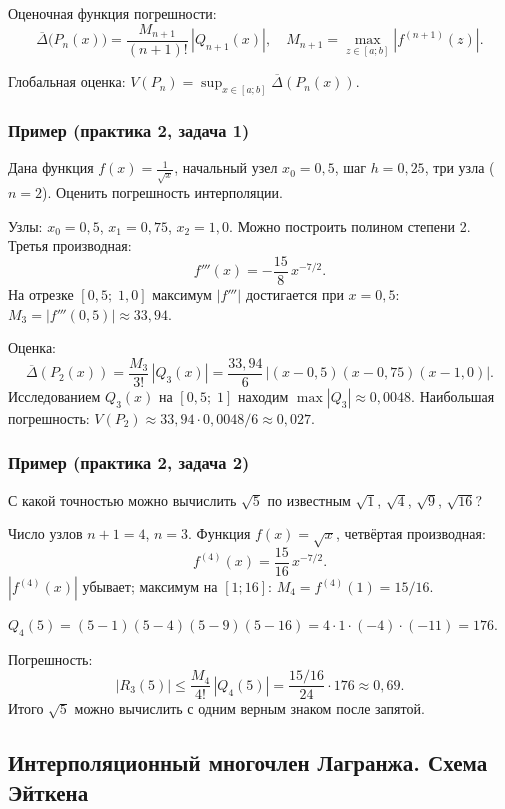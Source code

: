 Оценочная функция погрешности:
\[
    \overline{\Delta}\bigl(P_n(x)\bigr) = \frac{M_{n+1}}{(n+1)!}\, |Q_{n+1}(x)|, \quad M_{n+1} = \max_{z \in [a;b]} |f^{(n+1)}(z)|.
\]

Глобальная оценка: $V(P_n) = \sup_{x \in [a;b]} \overline{\Delta}(P_n(x))$.

\subsubsection*{Пример (практика 2, задача 1)}

Дана функция $f(x) = \frac{1}{\sqrt{x}}$, начальный узел $x_0 = 0{,}5$, шаг $h = 0{,}25$, три узла ($n = 2$). Оценить погрешность интерполяции.

Узлы: $x_0 = 0{,}5$, $x_1 = 0{,}75$, $x_2 = 1{,}0$. Можно построить полином степени 2. Третья производная:
\[
    f'''(x) = -\frac{15}{8}\, x^{-7/2}.
\]
На отрезке $[0{,}5;\; 1{,}0]$ максимум $|f'''|$ достигается при $x = 0{,}5$: $M_3 = |f'''(0{,}5)| \approx 33{,}94$.

Оценка:
\[
    \overline{\Delta}(P_2(x)) = \frac{M_3}{3!}\,|Q_3(x)| = \frac{33{,}94}{6}\,|(x - 0{,}5)(x - 0{,}75)(x - 1{,}0)|.
\]
Исследованием $Q_3(x)$ на $[0{,}5;\; 1]$ находим $\max |Q_3| \approx 0{,}0048$. Наибольшая погрешность: $V(P_2) \approx 33{,}94 \cdot 0{,}0048 / 6 \approx 0{,}027$.

\subsubsection*{Пример (практика 2, задача 2)}

С какой точностью можно вычислить $\sqrt{5}$ по известным $\sqrt{1}$, $\sqrt{4}$, $\sqrt{9}$, $\sqrt{16}$?

Число узлов $n + 1 = 4$, $n = 3$. Функция $f(x) = \sqrt{x}$, четвёртая производная:
\[
    f^{(4)}(x) = \frac{15}{16}\, x^{-7/2}.
\]
$|f^{(4)}(x)|$ убывает; максимум на $[1; 16]$: $M_4 = f^{(4)}(1) = 15/16$.

$Q_4(5) = (5-1)(5-4)(5-9)(5-16) = 4 \cdot 1 \cdot (-4) \cdot (-11) = 176$.

Погрешность:
\[
    |R_3(5)| \leq \frac{M_4}{4!}\, |Q_4(5)| = \frac{15/16}{24} \cdot 176 \approx 0{,}69.
\]
Итого $\sqrt{5}$ можно вычислить с одним верным знаком после запятой.


\subsection{Интерполяционный многочлен Лагранжа. Схема Эйткена}


